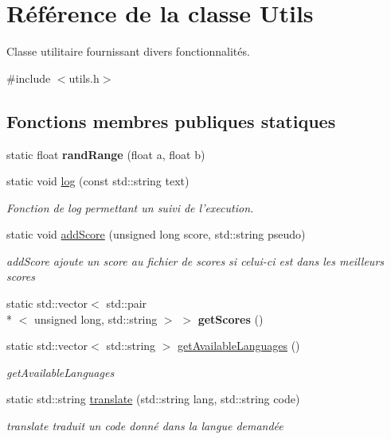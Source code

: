 \hypertarget{class_utils}{\section{Référence de la classe Utils}
\label{class_utils}
}


Classe utilitaire fournissant divers fonctionnalités.  




{\ttfamily \#include $<$utils.\+h$>$}

\subsection*{Fonctions membres publiques statiques}
\begin{DoxyCompactItemize}
\item 
\hypertarget{class_utils_a35aee32a9a6a1b11de974641a3bbb35d}{static float {\bfseries rand\+Range} (float a, float b)}\label{class_utils_a35aee32a9a6a1b11de974641a3bbb35d}

\item 
static void \hyperlink{class_utils_add80e3b1ce0771a9896d75c44d835fdc}{log} (const std\+::string text)
\begin{DoxyCompactList}\small\item\em Fonction de log permettant un suivi de l'execution. \end{DoxyCompactList}\item 
static void \hyperlink{class_utils_a1170497447081a5ba51cbfc437df18ac}{add\+Score} (unsigned long score, std\+::string pseudo)
\begin{DoxyCompactList}\small\item\em add\+Score ajoute un score au fichier de scores si celui-\/ci est dans les meilleurs scores \end{DoxyCompactList}\item 
\hypertarget{class_utils_aeea1037d0f36d661c72f86d4d9b178b6}{static std\+::vector$<$ std\+::pair\\*
$<$ unsigned long, std\+::string $>$ $>$ {\bfseries get\+Scores} ()}\label{class_utils_aeea1037d0f36d661c72f86d4d9b178b6}

\item 
static std\+::vector$<$ std\+::string $>$ \hyperlink{class_utils_a5f762bac5d0a135448e6b9b1247fde34}{get\+Available\+Languages} ()
\begin{DoxyCompactList}\small\item\em get\+Available\+Languages \end{DoxyCompactList}\item 
static std\+::string \hyperlink{class_utils_a5f5d31e13c2283e72d3494ddd6544338}{translate} (std\+::string lang, std\+::string code)
\begin{DoxyCompactList}\small\item\em translate traduit un code donné dans la langue demandée \end{DoxyCompactList}\end{DoxyCompactItemize}


